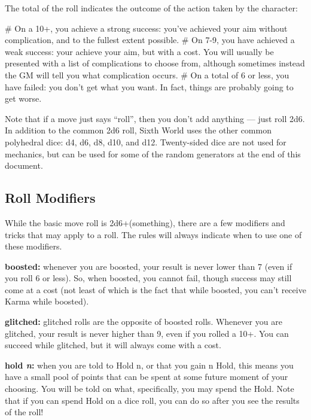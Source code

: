
The total of the roll indicates the outcome of the action taken by the character:

\begin{easylist}
    # On a 10+, you achieve a strong success: you've achieved your aim without complication, and to the fullest extent possible.
    # On 7-9, you have achieved a weak success: your achieve your aim, but with a cost. You will usually be presented with a list of complications to choose from, although sometimes instead the GM will tell you what complication occurs.
    # On a total of 6 or less, you have failed: you don’t get what you want. In fact, things are probably going to get worse.
\end{easylist}

Note that if a move just says ``roll'', then you don’t add anything — just roll 2d6. In addition to the common 2d6 roll, Sixth World uses the other common polyhedral dice: d4, d6, d8, d10, and d12. Twenty-sided dice are not used for mechanics, but can be used for some of the random generators at the end of this document.


\subsection{Roll Modifiers}
While the basic move roll is 2d6+(something), there are a few modifiers and tricks that may apply to a roll. The rules will always indicate when to use one of these modifiers.

\textbf{boosted:} whenever you are boosted, your result is never lower than 7 (even if you roll 6 or less). So, when boosted, you cannot fail, though success may still come at a cost (not least of which is the fact that while boosted, you can’t receive Karma while boosted).

\textbf{glitched:} glitched rolls are the opposite of boosted rolls. Whenever you are glitched, your result is never higher than 9, even if you rolled a 10+. You can succeed while glitched, but it will always come with a cost.

\textbf{hold \textit{n}:} when you are told to Hold n, or that you gain n Hold, this means you have a small pool of points that can be spent at some future moment of your choosing. You will be told on what, specifically, you may spend the Hold. Note that if you can spend Hold on a dice roll, you can do so after you see the results of the roll!

